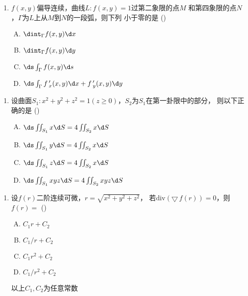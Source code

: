 \begin{frame}
	\linespread{2}
		\begin{enumerate}
		  \addtocounter{enumi}{7}
		  \item
		  $f(x,y)$偏导连续，曲线$L:f(x,y)=1$过第二象限的点$M$
		  和第四象限的点$N$，$\Gamma$为$L$上从$M$到$N$的一段弧，则下列
		  小于零的是\;
		  ({\;\uncover<2->{\alert{B}}\;})
		  \begin{enumerate}[(A)]
		    \item $\dint_{\Gamma}f(x,y)\d x$
		    \item $\dint_{\Gamma}f(x,y)\d y$
		    \item $\ds\int_{\Gamma}f(x,y)\d s$
		    \item $\ds\int_{\Gamma}f\,'_x(x,y)\d x+f\,'_y(x,y)\d y$
		  \end{enumerate}
		\end{enumerate}
\end{frame}

\begin{frame}
	\linespread{2}
		\begin{enumerate}
		  \addtocounter{enumi}{8}
		  \item
		  设曲面$S_1:x^2+y^2+z^2=1(z\geq
		  0)$，$S_2$为$S_1$在第一卦限中的部分，
		  则以下正确的是\;
		  ({\;\;}) 
		  \begin{enumerate}[(A)]
		    \item $\ds\iint_{S_1}x\d S=4\iint_{S_2}x\d S$
		    \item $\ds\iint_{S_1}y\d S=4\iint_{S_2}x\d S$
		    \item $\ds\iint_{S_1}z\d S=4\iint_{S_2}x\d S$
		    \item $\ds\iint_{S_1}xyz\d S=4\iint_{S_2}xyz\d S$
		  \end{enumerate}
		\end{enumerate}
\end{frame}

\begin{frame}
	\linespread{2}
		\begin{enumerate}
		  \addtocounter{enumi}{9}
		  \item 设$f(r)$二阶连续可微，$r=\sqrt{x^2+y^2+z^2}$，
		  若$\mathrm{div}(\bigtriangledown\,f(r))=0$，则$f(r)=$\;
		  ({\;\;}) 
		  \begin{enumerate}[(A)]
		    \item $C_1r+C_2$
		    \item $C_1/r+C_2$
		    \item $C_1r^2+C_2$
		    \item $C_1/r^2+C_2$
		  \end{enumerate}
		  以上$C_1,C_2$为任意常数
		\end{enumerate}
\end{frame}


